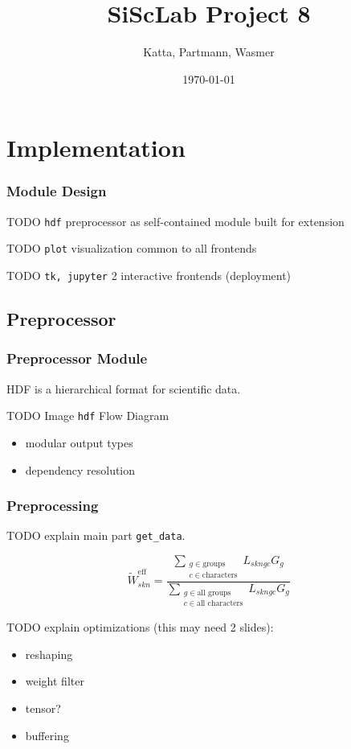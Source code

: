 \documentclass{beamer}
\begin{document}
\title{SiScLab Project 8}  
\author{Katta, Partmann, Wasmer}
\date{\today} 


\section{Implementation}
\label{sec:implementation}

\begin{frame}\frametitle{Module Design}
    TODO \texttt{hdf} preprocessor as self-contained module built for extension
    
    TODO \texttt{plot} visualization common to all frontends
    
    TODO \texttt{tk, jupyter} 2 interactive frontends (deployment)
\end{frame}

\subsection{Preprocessor}
\label{sec:preprocessor}

\begin{frame}
    \frametitle{Preprocessor Module}
    HDF is a hierarchical format for scientific data.

    TODO Image \texttt{hdf} Flow Diagram

    \begin{itemize}
    \item modular output types
    \item dependency resolution
    \end{itemize}
\end{frame}

\begin{frame}
    \frametitle{Preprocessing}

    TODO explain main part \texttt{get\_data}.
    
    \begin{displaymath}
        \tilde{W}^{\text{eff}}_{skn} = \frac{\sum\limits_{\substack{g \in \text{groups} \\ c \in \text{characters}}} L_{skngc} G_g}{\sum\limits_{\substack{g \in \text{all groups} \\ c \in \text{all characters}}} L_{skngc} G_g}
    \end{displaymath}

    TODO explain optimizations (this may need 2 slides):
    \begin{itemize}
    \item reshaping
    \item weight filter
    \item tensor?
    \item buffering
    \end{itemize}
\end{frame}
\end{document}

